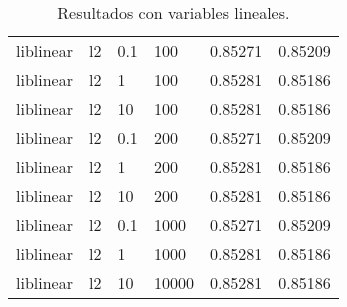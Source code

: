 \documentclass[11pt,a4paper]{article}
\begin{document}
\begin{table}[h]
\begin{center}
\begin{tabular}{|l|l|l|l|l|l|}
liblinear & l2 & 0.1 & 100 & 0.85271 & 0.85209\\

liblinear & l2 & 1 & 100 & 0.85281 & 0.85186\\

liblinear & l2 & 10  &100  & 0.85281 & 0.85186\\

liblinear & l2 & 0.1 & 200 & 0.85271 & 0.85209\\

liblinear & l2 & 1  &200  & 0.85281 & 0.85186\\

liblinear & l2 & 10 & 200 & 0.85281 & 0.85186\\

liblinear & l2 & 0.1 & 1000 & 0.85271 & 0.85209\\

liblinear & l2 & 1 & 1000 & 0.85281 & 0.85186\\

liblinear & l2 & 10  &10000 & 0.85281 & 0.85186\\

\end{tabular}
\end{center}
\caption{Resultados con variables lineales.}
	\end{table}
\end{document}
